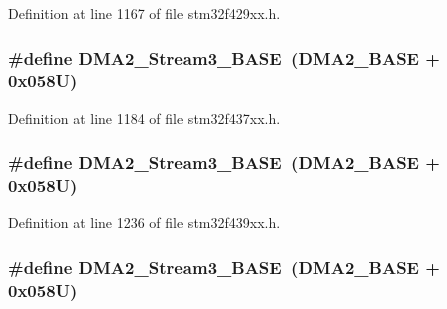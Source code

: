 Definition at line 1167 of file stm32f429xx.\+h.

\subsubsection[{\texorpdfstring{D\+M\+A2\+\_\+\+Stream3\+\_\+\+B\+A\+SE}{DMA2_Stream3_BASE}}]{\setlength{\rightskip}{0pt plus 5cm}\#define D\+M\+A2\+\_\+\+Stream3\+\_\+\+B\+A\+SE~({\bf D\+M\+A2\+\_\+\+B\+A\+SE} + 0x058\+U)}\hypertarget{group___peripheral__memory__map_gaf3a9480e08c6ae94f4482e0cdaebdd17}{}\label{group___peripheral__memory__map_gaf3a9480e08c6ae94f4482e0cdaebdd17}


Definition at line 1184 of file stm32f437xx.\+h.

\subsubsection[{\texorpdfstring{D\+M\+A2\+\_\+\+Stream3\+\_\+\+B\+A\+SE}{DMA2_Stream3_BASE}}]{\setlength{\rightskip}{0pt plus 5cm}\#define D\+M\+A2\+\_\+\+Stream3\+\_\+\+B\+A\+SE~({\bf D\+M\+A2\+\_\+\+B\+A\+SE} + 0x058\+U)}\hypertarget{group___peripheral__memory__map_gaf3a9480e08c6ae94f4482e0cdaebdd17}{}\label{group___peripheral__memory__map_gaf3a9480e08c6ae94f4482e0cdaebdd17}


Definition at line 1236 of file stm32f439xx.\+h.

\subsubsection[{\texorpdfstring{D\+M\+A2\+\_\+\+Stream3\+\_\+\+B\+A\+SE}{DMA2_Stream3_BASE}}]{\setlength{\rightskip}{0pt plus 5cm}\#define D\+M\+A2\+\_\+\+Stream3\+\_\+\+B\+A\+SE~({\bf D\+M\+A2\+\_\+\+B\+A\+SE} + 0x058\+U)}\hypertarget{group___peripheral__memory__map_gaf3a9480e08c6ae94f4482e0cdaebdd17}{}\label{group___peripheral__memory__map_gaf3a9480e08c6ae94f4482e0cdaebdd17}


